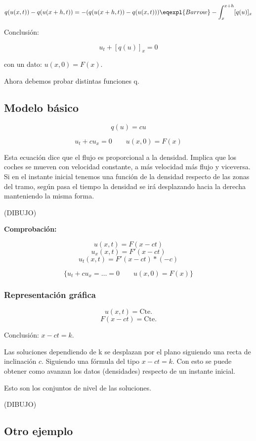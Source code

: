 \documentclass[palatino]{apuntes}
\begin{document}
$$ q(u(x,t)) - q(u(x+h,t)) = -( q(u(x+h,t)) -  q(u(x,t)) ) \eqexpl{Barrow} -\int^{x+h}_{x} [q(u)]_{x} $$

Conclusión:

$$ u_t + [q(u)]_{x} = 0$$

con un dato: $u(x, 0) = F(x)$.

Ahora debemos probar distintas funciones q.


\subsection{Modelo básico}

$$q(u) = cu$$

$$u_t + cu_x = 0 \quad\quad u(x,0) = F(x)$$


Esta ecuación dice que el flujo es proporcional a la densidad. Implica que los coches se mueven con velocidad constante, a más velocidad más flujo y viceversa. Si en el instante inicial tenemos una función de la densidad respecto de las zonas del tramo, según pasa el tiempo la densidad se irá desplazando hacia la derecha manteniendo la misma forma.

(DIBUJO)

\textbf{Comprobación:}

$$ u(x,t) = F(x-ct) $$
$$ u_x(x,t) = F'(x-ct)$$
$$u_t(x,t) = F'(x-ct)*(-c)$$

$$ \{ u_t + cu_x = … = 0 \quad\quad u(x,0) = F(x) \} $$

\subsubsection{Representación gráfica}


$$u(x,t) = \text{Cte.}$$
$$F(x - ct) = \text{Cte.}$$

Conclusión: $x-ct = k$.


Las soluciones dependiendo de k se desplazan por el plano siguiendo una recta de inclinación $c$. Siguiendo una fórmula del tipo $x-ct = k$. Con esto se puede obtener como avanzan los datos (densidades) respecto de un instante inicial.

Esto son los conjuntos de nivel de las soluciones.

(DIBUJO)



\subsection{Otro ejemplo}
\end{document}
